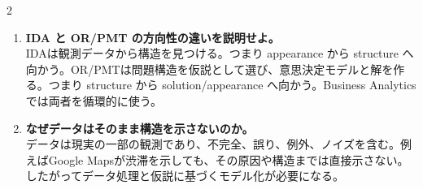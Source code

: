 \begin{multicols}{2}
\begin{enumerate}
\item \textbf{IDA と OR/PMT の方向性の違いを説明せよ。}\\
IDAは観測データから構造を見つける。つまり appearance から structure へ向かう。OR/PMTは問題構造を仮説として選び、意思決定モデルと解を作る。つまり structure から solution/appearance へ向かう。Business Analyticsでは両者を循環的に使う。
\item \textbf{なぜデータはそのまま構造を示さないのか。}\\
データは現実の一部の観測であり、不完全、誤り、例外、ノイズを含む。例えばGoogle Mapsが渋滞を示しても、その原因や構造までは直接示さない。したがってデータ処理と仮説に基づくモデル化が必要になる。
\end{enumerate}

\end{multicols}

\clearpage



\vspace{1.5mm}

